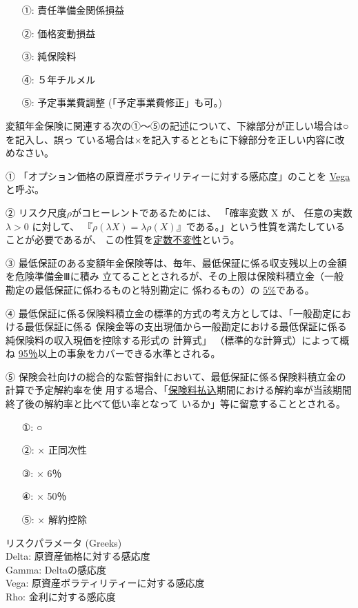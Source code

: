 \documentclass[report,gutter=10mm,fore-edge=10mm,uplatex,dvipdfmx]{jlreq}
\begin{document}
{\answer{}
\begin{itemize}
\item[ ①: ] 責任準備金関係損益
\item[ ②: ] 価格変動損益
\item[ ③: ] 純保険料
\item[ ④: ] ５年チルメル
\item[ ⑤: ] 予定事業費調整 (「予定事業費修正」も可。)
\end{itemize}

変額年金保険に関連する次の①～⑤の記述について、下線部分が正しい場合は○を記入し、誤っ
ている場合は×を記入するとともに下線部分を正しい内容に改めなさい。

① 「オプション価格の原資産ボラティリティーに対する感応度」のことを \underline{Vega} と呼ぶ。

② リスク尺度$\rho$がコヒーレントであるためには、
「確率変数 X が、
任意の実数$\lambda>0$ に対して、
『$\rho(\lambda X)=\lambda\rho(X)$』である。」という性質を満たしていることが必要であるが、
この性質を\underline{定数不変性}という。

③ 最低保証のある変額年金保険等は、毎年、最低保証に係る収支残以上の金額を危険準備金Ⅲに積み
立てることとされるが、その上限は保険料積立金（一般勘定の最低保証に係わるものと特別勘定に
係わるもの）の \underline{5\%}である。

④ 最低保証に係る保険料積立金の標準的方式の考え方としては、「一般勘定における最低保証に係る
保険金等の支出現価から一般勘定における最低保証に係る純保険料の収入現価を控除する形式の
計算式」
（標準的な計算式）によって概ね \underline{95％}以上の事象をカバーできる水準とされる。

⑤ 保険会社向けの総合的な監督指針において、最低保証に係る保険料積立金の計算で予定解約率を使
用する場合、「\underline{保険料払込}期間における解約率が当該期間終了後の解約率と比べて低い率となって
いるか」等に留意することとされる。
\answer{}
\begin{itemize}
\item[①: ]  ○
\item[②: ]  × 正同次性
\item[③: ]  × 6％
\item[④: ]  × 50％
\item[⑤: ]  × 解約控除
\end{itemize}

リスクパラメータ (Greeks)\\
Delta: 原資産価格に対する感応度\\
Gamma: Deltaの感応度\\
Vega: 原資産ボラティリティーに対する感応度\\
Rho: 金利に対する感応度

}
\end{document}
